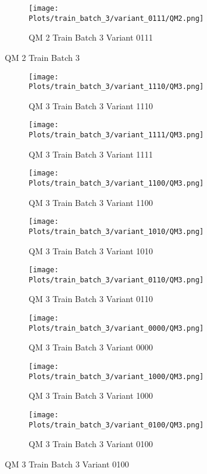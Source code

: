 \documentclass{DissertateFigs}
\begin{document}
\begin{figure}[t!]
\medskip

    \begin{subfigure}{0.47\textwidth}
    \texttt{[image: Plots/train\_batch\_3/variant\_0111/QM2.png]}
    \caption{QM 2 Train Batch 3 Variant 0111}
    \end{subfigure}
\caption{QM 2 Train Batch 3}
    \end{figure}
\clearpage
\begin{figure}[t!]
    \begin{subfigure}{0.47\textwidth}
    \texttt{[image: Plots/train\_batch\_3/variant\_1110/QM3.png]}
    \caption{QM 3 Train Batch 3 Variant 1110}
    \end{subfigure}
    \begin{subfigure}{0.47\textwidth}
    \texttt{[image: Plots/train\_batch\_3/variant\_1111/QM3.png]}
    \caption{QM 3 Train Batch 3 Variant 1111}
    \end{subfigure}

\medskip

    \begin{subfigure}{0.47\textwidth}
    \texttt{[image: Plots/train\_batch\_3/variant\_1100/QM3.png]}
    \caption{QM 3 Train Batch 3 Variant 1100}
    \end{subfigure}
    \begin{subfigure}{0.47\textwidth}
    \texttt{[image: Plots/train\_batch\_3/variant\_1010/QM3.png]}
    \caption{QM 3 Train Batch 3 Variant 1010}
    \end{subfigure}

\medskip

    \begin{subfigure}{0.47\textwidth}
    \texttt{[image: Plots/train\_batch\_3/variant\_0110/QM3.png]}
    \caption{QM 3 Train Batch 3 Variant 0110}
    \end{subfigure}
    \begin{subfigure}{0.47\textwidth}
    \texttt{[image: Plots/train\_batch\_3/variant\_0000/QM3.png]}
    \caption{QM 3 Train Batch 3 Variant 0000}
    \end{subfigure}

\medskip

    \begin{subfigure}{0.47\textwidth}
    \texttt{[image: Plots/train\_batch\_3/variant\_1000/QM3.png]}
    \caption{QM 3 Train Batch 3 Variant 1000}
    \end{subfigure}
    \begin{subfigure}{0.47\textwidth}
    \texttt{[image: Plots/train\_batch\_3/variant\_0100/QM3.png]}
    \caption{QM 3 Train Batch 3 Variant 0100}
    \end{subfigure}


\end{figure}
\end{document}
